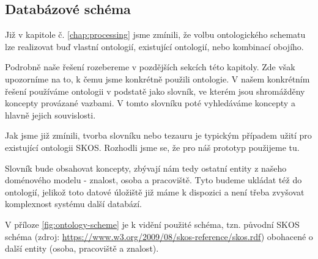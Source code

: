 \subsection{Databázové schéma}
Již v kapitole č. \ref{chap:processing} jsme zmínili, že volbu ontologického schematu lze realizovat buď vlastní ontologií, existující ontologií, nebo kombinací obojího.\par
Podrobně naše řešení rozebereme v pozdějších sekcích této kapitoly. Zde však upozorníme na to, k čemu jsme konkrétně použili ontologie. V našem konkrétním řešení používáme ontologii v podstatě jako slovník, ve kterém jsou shromážděny koncepty provázané vazbami. V tomto slovníku poté vyhledáváme koncepty a hlavně jejich souvislosti.\par
Jak jsme již zmínili, tvorba slovníku nebo tezauru je typickým případem užití pro existující ontologii SKOS. Rozhodli jsme se, že pro náš prototyp použijeme tu.\par
Slovník bude obsahovat koncepty, zbývají nám tedy ostatní entity z našeho doménového modelu - znalost, osoba a pracoviště. Tyto budeme ukládat též do ontologií, jelikož toto datové úložiště již máme k dispozici a není třeba zvyšovat komplexnost systému další databází.\par
V příloze \ref{fig:ontology-scheme} je k vidění použité schéma, tzn. původní SKOS schéma (zdroj: \url{https://www.w3.org/2009/08/skos-reference/skos.rdf}) obohacené o další entity (osoba, pracoviště a znalost).

